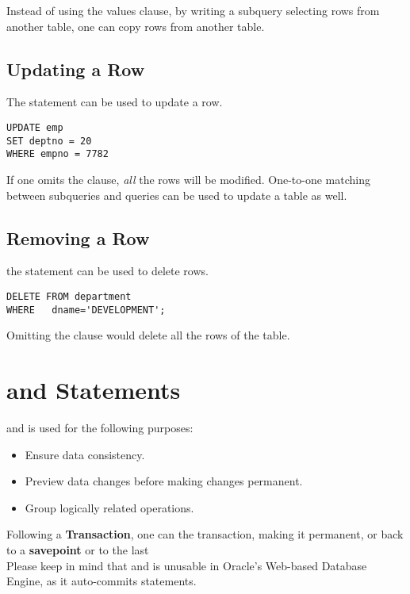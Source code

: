 \documentclass[11pt,a4paper,twocolumn]{book}
\begin{document}
Instead of using the values clause, by writing a subquery selecting rows from another table, one can copy rows from another table.

\subsection{Updating a Row}

The  statement can be used to update a row.

\begin{lstlisting}
UPDATE emp
SET	deptno = 20
WHERE empno = 7782
\end{lstlisting}

If one omits the  clause, \textit{all} the rows will be modified. One-to-one matching between subqueries and queries can be used to update a table as well.

\subsection{Removing a Row}

the  statement can be used to delete rows.

 \begin{lstlisting}
DELETE FROM	department
WHERE	dname='DEVELOPMENT';
\end{lstlisting}

Omitting the  clause would delete all the rows of the table.

\section{ and  Statements}

 and  is used for the following purposes:

\begin{itemize}
\item Ensure data consistency.
\item Preview data changes before making changes permanent.
\item Group logically related operations.
\end{itemize}

Following a \textbf{Transaction}, one can  the transaction, making it permanent, or  back to a \textbf{savepoint} or to the last \\

Please keep in mind that  and  is unusable in Oracle's Web-based Database Engine, as it auto-commits statements.
\end{document}
